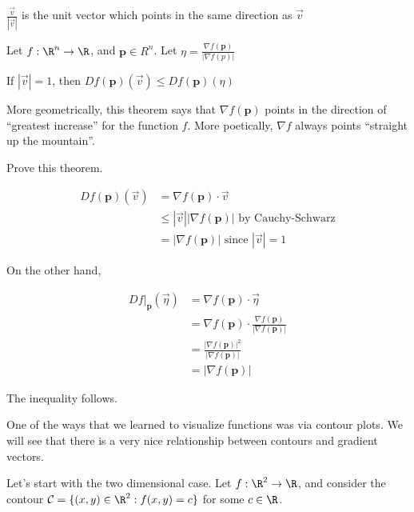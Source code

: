 \documentclass{ximera}
\begin{document}
 \begin{free-response}
 	$\frac{\vec{v}}{|\vec{v}|}$ is the unit vector which points in the same direction as $\vec{v}$
 \end{free-response}	
 
 \begin{theorem}
 	Let $f:\R^n \to \R$, and $\mathbf{p} \in R^n$.   Let $\eta = \frac{\nabla f(\mathbf{p})}{\left|\nabla f (p)\right|}$
 	
 	If $\left|\vec{v}\right| = 1$, then $Df(\mathbf{p})(\vec{v}) \leq Df(\mathbf{p})( \eta )$
 \end{theorem}

	More geometrically, this theorem says that $\nabla f(\mathbf{p})$ points in the direction of  ``greatest increase'' for the function $f$.
	More poetically, $\nabla f$ always points ``straight up the mountain''.
	

	Prove this theorem.
	
	\begin{free-response}
		 
		 \begin{align*}
		 	Df(\mathbf{p})(\vec{v}) &= \nabla f (\mathbf{p}) \cdot \vec{v}\\
		 		&\leq |\vec{v}||\nabla f(\mathbf{p})| \text{ by Cauchy-Schwarz}\\
		 		&= |\nabla f(\mathbf{p})| \text{ since $|\vec{v}|=1$}
		 \end{align*}
		 
		 On the other hand, 
		 
		 \begin{align*}
		 	Df\big|_{\mathbf{p}}(\vec{\eta}) &= \nabla f (\mathbf{p}) \cdot \vec{\eta}\\
		 		&= \nabla f (\mathbf{p}) \cdot  \frac{\nabla f(\mathbf{p})}{\left|\nabla f (\mathbf{p})\right|}\\
		 		&= \frac{\left| \nabla f(\mathbf{p})\right|^2}{\left| \nabla f(\mathbf{p})\right|}\\
		 		&= \left| \nabla f (\mathbf{p})\right|
		 			 \end{align*}
		 			 
		  The inequality follows.
	\end{free-response}
	
	

One of the ways that we learned to visualize functions was via contour plots.  We will see that there is a very nice relationship between contours and gradient vectors.

Let's start with the two dimensional case.  Let $f: \R^2 \to \R$, and consider the contour $\mathcal{C} = \{ (x,y) \in \R^2 :  f(x,y) = c \}$ for some $c \in \R$.
\end{document}
